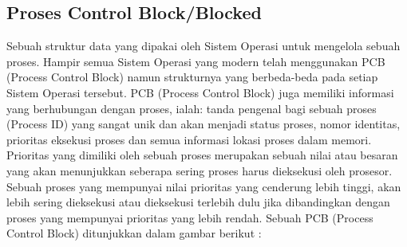 	\subsection{Proses Control Block/Blocked}
	Sebuah struktur data yang dipakai oleh Sistem Operasi untuk mengelola sebuah proses. Hampir semua Sistem Operasi yang modern telah menggunakan PCB (Process Control Block) namun strukturnya yang berbeda-beda pada setiap Sistem Operasi tersebut. PCB (Process Control Block) juga memiliki informasi yang berhubungan dengan proses, ialah: tanda pengenal bagi sebuah proses (Process ID) yang sangat unik dan akan menjadi status proses, nomor identitas, prioritas eksekusi proses dan semua informasi lokasi proses dalam memori. Prioritas yang dimiliki oleh sebuah proses merupakan sebuah nilai atau besaran yang akan menunjukkan seberapa sering proses harus dieksekusi oleh prosesor. Sebuah proses yang mempunyai nilai prioritas yang cenderung lebih tinggi, akan lebih sering dieksekusi atau dieksekusi terlebih dulu jika dibandingkan dengan proses yang mempunyai prioritas yang lebih rendah.
	Sebuah PCB (Process Control Block) ditunjukkan dalam gambar berikut : 
	
